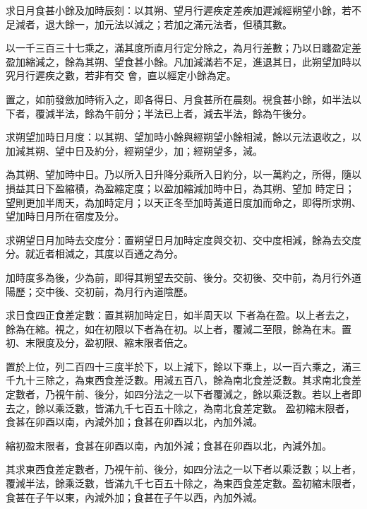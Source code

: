 \begin{pinyinscope}
 求日月食甚小餘及加時辰刻：以其朔、望月行遲疾定差疾加遲減經朔望小餘，若不足減者，退大餘一，加元法以減之；若加之滿元法者，但積其數。



 以一千三百三十七乘之，滿其度所直月行定分除之，為月行差數；乃以日躔盈定差盈加縮減之，餘為其朔、望食甚小餘。凡加減滿若不足，進退其日，此朔望加時以究月行遲疾之數，若非有交
 會，直以經定小餘為定。



 置之，如前發斂加時術入之，即各得日、月食甚所在晨刻。視食甚小餘，如半法以下者，覆減半法，餘為午前分；半法已上者，減去半法，餘為午後分。



 求朔望加時日月度：以其朔、望加時小餘與經朔望小餘相減，餘以元法退收之，以加減其朔、望中日及約分，經朔望少，加；經朔望多，減。



 為其朔、望加時中日。乃以所入日升降分乘所入日約分，以一萬約之，所得，隨以損益其日下盈縮積，為盈縮定度；以盈加縮減加時中日，為其朔、望加
 時定日；望則更加半周天，為加時定月；以天正冬至加時黃道日度加而命之，即得所求朔、望加時日月所在宿度及分。



 求朔望日月加時去交度分：置朔望日月加時定度與交初、交中度相減，餘為去交度分。就近者相減之，其度以百通之為分。



 加時度多為後，少為前，即得其朔望去交前、後分。交初後、交中前，為月行外道陽歷；交中後、交初前，為月行內道陰歷。



 求日食四正食差定數：置其朔加時定日，如半周天以
 下者為在盈。以上者去之，餘為在縮。視之，如在初限以下者為在初。以上者，覆減二至限，餘為在末。置初、末限度及分，盈初限、縮末限者倍之。



 置於上位，列二百四十三度半於下，以上減下，餘以下乘上，以一百六乘之，滿三千九十三除之，為東西食差泛數。用減五百八，餘為南北食差泛數。其求南北食差定數者，乃視午前、後分，如四分法之一以下者覆減之，餘以乘泛數。若以上者即去之，餘以乘泛數，皆滿九千七百五十除之，為南北食差定數。
 盈初縮末限者，食甚在卯酉以南，內減外加；食甚在卯酉以北，內加外減。



 縮初盈末限者，食甚在卯酉以南，內加外減；食甚在卯酉以北，內減外加。



 其求東西食差定數者，乃視午前、後分，如四分法之一以下者以乘泛數；以上者，覆減半法，餘乘泛數，皆滿九千七百五十除之，為東西食差定數。盈初縮末限者，食甚在子午以東，內減外加；食甚在子午以西，內加外減。




\end{pinyinscope}
